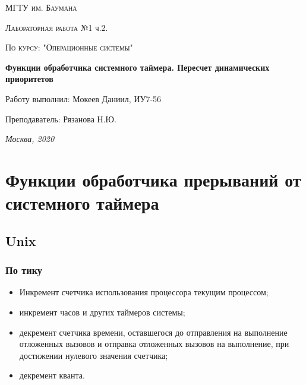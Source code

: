 \documentclass[12pt]{report}
\begin{document}
\begin{titlepage}
	\centering
	{\scshape\LARGE МГТУ им. Баумана \par}
	\vspace{3cm}
	{\scshape\Large Лабораторная работа №1 ч.2.\par}
	\vspace{0.5cm}	
	{\scshape\Large По курсу: "Операционные системы"\par}
	\vspace{1.5cm}
	\centering
	 {\huge\bfseries Функции обработчика системного таймера. Пересчет динамических приоритетов\par}
	\vspace{2cm}
	\Large Работу выполнил: Мокеев Даниил, ИУ7-56\par
	\vspace{0.5cm}
	\Large Преподаватель:  Рязанова Н.Ю.\par

	\vfill
	\large \textit {Москва, 2020} \par
\end{titlepage}


\newpage

\chapter{Функции обработчика прерываний от системного таймера}
\section{Unix}
\subsection{По тику}
\begin{itemize}
	\item Инкремент	счетчика использования процессора текущим процессом;
	\item инкремент часов и других таймеров системы;
	\item декремент счетчика времени, оставшегося до отправления на выполнение отложенных вызовов и отправка отложенных вызовов на выполнение, при достижении нулевого значения счетчика;
	\item декремент кванта.
\end{itemize}
\end{document}
